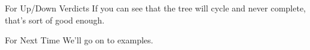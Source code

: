 \documentclass[
  ignorenonframetext,
]{beamer}
\renewcommand{\,}{\text{, }}
\begin{document}
\begin{frame}{For Up/Down Verdicts}
\protect\hypertarget{for-updown-verdicts}{}
If you can see that the tree will cycle and never complete, that's sort
of good enough.
\end{frame}

\begin{frame}{For Next Time}
\protect\hypertarget{for-next-time}{}
We'll go on to examples.
\end{frame}
\end{document}

